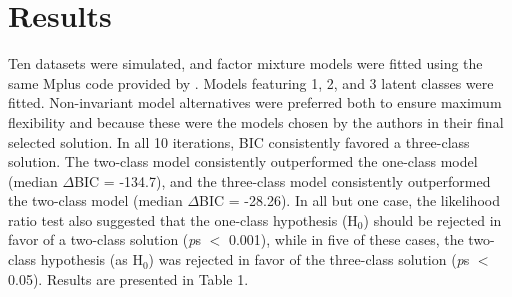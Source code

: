 \documentclass[letterpaper,11pt]{article}
\begin{document}
\section*{Results}

Ten datasets were simulated, and factor mixture models were fitted using the same Mplus code provided by . Models featuring 1, 2, and 3 latent classes were fitted. Non-invariant model alternatives were preferred both to ensure maximum flexibility and because these were the models chosen by the authors in their final selected solution. In all 10 iterations, BIC consistently favored a three-class solution. The two-class model consistently outperformed the one-class model (median $\Delta$BIC = -134.7), and the three-class model consistently outperformed the two-class model (median $\Delta$BIC = -28.26). In all but one case, the likelihood ratio test also suggested that the one-class hypothesis (H$_{0}$) should be rejected in favor of a two-class solution (\textit{p}s $<$ 0.001), while in five of these cases, the two-class hypothesis (as H$_{0}$) was rejected in favor of the three-class solution (\textit{p}s $<$ 0.05). Results are presented in Table 1.
\end{document}
